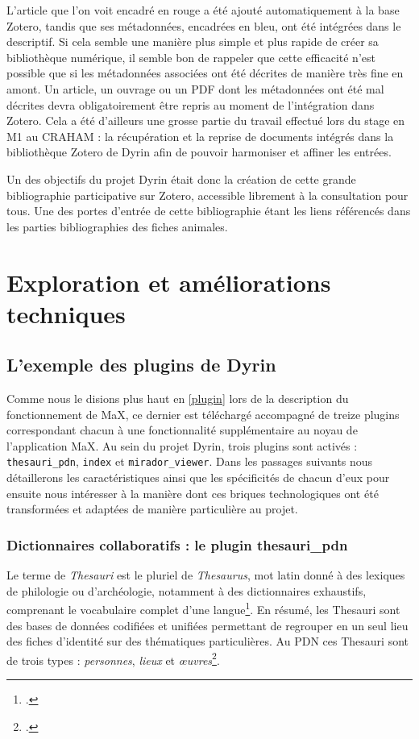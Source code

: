 \documentclass[a4paper,12pt,twoside]{book}
\begin{document}
L'article que l'on voit encadré en rouge a été ajouté automatiquement à la base Zotero, tandis que ses métadonnées, encadrées en bleu, ont été intégrées dans le descriptif.
Si cela semble une manière plus simple et plus rapide de créer sa bibliothèque numérique, il semble bon de rappeler que cette efficacité n'est possible que si les métadonnées associées ont été décrites de manière très fine en amont. Un article, un ouvrage ou un PDF dont les métadonnées ont été mal décrites devra obligatoirement être repris au moment de l'intégration dans Zotero. Cela a été d'ailleurs une grosse partie du travail effectué lors du stage en M1 au \acrshort{CRAHAM} : la récupération et la reprise de documents intégrés dans la bibliothèque Zotero de Dyrin afin de pouvoir harmoniser et affiner les entrées.


Un des objectifs du projet Dyrin était donc la création de cette grande bibliographie participative sur Zotero, accessible librement à la consultation pour tous. Une des portes d'entrée de cette bibliographie étant les liens référencés dans les parties bibliographies des fiches animales.\\



\chapter{Exploration et améliorations techniques}
\section{L'exemple des plugins de Dyrin}\label{plugin-dyrin}
Comme nous le disions plus haut en \ref{plugin} lors de la description du fonctionnement de MaX, ce dernier est téléchargé accompagné de treize plugins correspondant chacun à une fonctionnalité supplémentaire au noyau de l'application MaX. Au sein du projet Dyrin, trois plugins sont activés : \texttt{thesauri\_pdn}, \texttt{index} et \texttt{mirador\_viewer}. Dans les passages suivants nous détaillerons les caractéristiques ainsi que les spécificités de chacun d'eux pour ensuite nous intéresser à la manière dont ces briques technologiques ont été transformées et adaptées de manière particulière au projet.

\subsection{Dictionnaires collaboratifs : le plugin thesauri\_pdn}\label{thesauri}
Le terme de \textit{Thesauri} est le pluriel de \textit{Thesaurus}, mot latin donné à des lexiques de philologie ou d'archéologie, notamment à des dictionnaires exhaustifs, comprenant le vocabulaire complet d'une langue\footcite{def_thesau}. En résumé, les Thesauri sont des bases de données codifiées et unifiées permettant de regrouper en un seul lieu des fiches d'identité sur des thématiques particulières. Au \acrshort{PDN} ces Thesauri sont de trois types : \textit{personnes}, \textit{lieux} et \textit{\oe{}uvres}\footcite{thesauri}.
\end{document}
